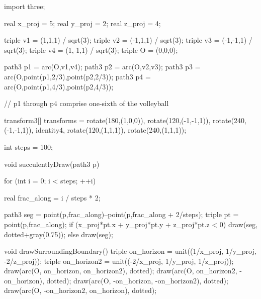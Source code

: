 \documentclass[../key.tex]{subfiles}
\begin{document}
\begin{asydef}
	import three;

	real x_proj = 5;
	real y_proj = 2;
	real z_proj = 4;

	triple v1 = (1,1,1) / sqrt(3);
	triple v2 = (-1,1,1) / sqrt(3);
	triple v3 = (-1,-1,1) / sqrt(3);
	triple v4 = (1,-1,1) / sqrt(3);
	triple O = (0,0,0);

	path3 p1 = arc(O,v1,v4);
	path3 p2 = arc(O,v2,v3);
	path3 p3 = arc(O,point(p1,2/3),point(p2,2/3));
	path3 p4 = arc(O,point(p1,4/3),point(p2,4/3));

	// p1 through p4 comprise one-sixth of the volleyball

	transform3[] transforms = {
		rotate(180,(1,0,0)),
		rotate(120,(-1,-1,1)),
		rotate(240,(-1,-1,1)),
		identity4,
		rotate(120,(1,1,1)),
		rotate(240,(1,1,1))};

	int steps = 100;

	void succulentlyDraw(path3 p) {
		for (int i = 0; i < steps; ++i) {
			real frac_along = i / steps * 2;

			path3 seg = point(p,frac_along)--point(p,frac_along + 2/steps);
			triple pt = point(p,frac_along);
			if (x_proj*pt.x + y_proj*pt.y + z_proj*pt.z < 0) {
				draw(seg, dotted+gray(0.75));
			} else {
				draw(seg);
			}
		}
	}

	void drawSurroundingBoundary() {
		triple on_horizon = unit((1/x_proj, 1/y_proj, -2/z_proj));
		triple on_horizon2 = unit((-2/x_proj, 1/y_proj, 1/z_proj));
		draw(arc(O, on_horizon, on_horizon2), dotted);
		draw(arc(O, on_horizon2, -on_horizon), dotted);
		draw(arc(O, -on_horizon, -on_horizon2), dotted);
		draw(arc(O, -on_horizon2, on_horizon), dotted);
	}
\end{asydef}
\end{document}
